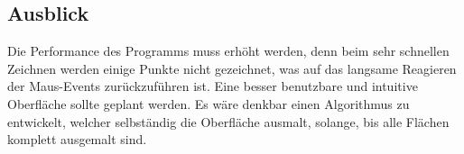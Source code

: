 \subsection{Ausblick}
\label{subsec:ausblick}
Die Performance des Programms muss erhöht werden, denn beim sehr schnellen Zeichnen werden einige Punkte nicht gezeichnet, was auf das langsame Reagieren der Maus-Events zurückzuführen ist. Eine besser benutzbare und intuitive Oberfläche sollte geplant werden. Es wäre denkbar einen Algorithmus zu entwickelt, welcher selbständig die Oberfläche ausmalt, solange, bis alle Flächen komplett ausgemalt sind.